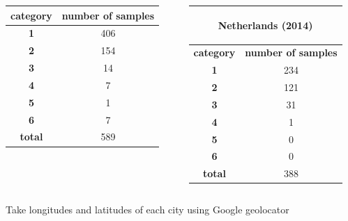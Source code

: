 \documentclass[c]{beamer}
\begin{document}
\begin{frame}
\begin{itemize}
{\begin{columns}
\begin{column}{0.33\textwidth}
\begin{table}
\begin{center}
\begin{adjustbox}{max width=0.5\textwidth}
\begin{tabular}{|c|c|}
      \hline
      \textbf{category} & \textbf{number of samples}\\
      \hline
      \textbf{1} & 406\\
      \hline
      \textbf{2} & 154\\
      \hline
      \textbf{3} & 14\\
      \hline
      \textbf{4} & 7\\
      \hline
      \textbf{5} & 1\\
      \hline
      \textbf{6} & 7\\
      \hline
      \textbf{total} & 589\\
      \hline
    \end{tabular}
   \end{adjustbox}
   \end{center}
   \end{table}
  \end{column}
  \begin{column}{0.33\textwidth}
   \begin{table}
   \begin{center}
   \begin{adjustbox}{max width=0.5\textwidth}
    \begin{tabular}{|c|c|}
      \hline
      \multicolumn{2}{|c|}{\begin{bf}Netherlands (2014)\end{bf}} \\
      \hline
      \textbf{category} & \textbf{number of samples}\\
      \hline
      \textbf{1} & 234\\
      \hline
      \textbf{2} & 121\\
      \hline
      \textbf{3} & 31\\
      \hline
      \textbf{4} & 1\\
      \hline
      \textbf{5} & 0\\
      \hline
      \textbf{6} & 0 \\
      \hline
      \textbf{total} & 388\\
      \hline
    \end{tabular}
   \end{adjustbox}
   \end{center}
   \end{table}
  \end{column}
 \end{columns}
 \item Take longitudes and latitudes of each city using Google geolocator
}
\end{itemize}
\end{frame}
\end{document}
